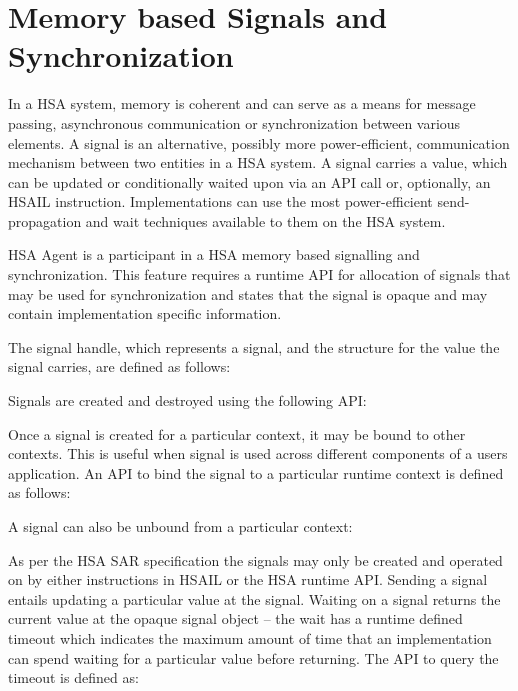 \documentclass{book}
\begin{document}
\hypertarget{signals}{}\section{Memory based Signals and
Synchronization}\label{signals}

In a HSA system, memory is coherent and can serve as a means for
message passing, asynchronous communication or synchronization
between various elements.  A signal is an alternative, possibly more
power-efficient, communication mechanism between two entities in a
HSA system. A signal carries a value, which can be updated or
conditionally waited upon via an API call or, optionally, an HSAIL
instruction. Implementations can use the most power-efficient send-propagation
and wait techniques available to them on the  HSA system.

HSA Agent is a participant in a HSA memory based signalling and
synchronization.  This feature requires a runtime API for allocation
of signals that may be used for synchronization and states that the
signal is opaque and may contain implementation specific information.

The signal handle, which represents a signal, and the structure for
the value the signal carries, are defined as follows:



Signals are created and destroyed using the following API:




Once a signal is created for a particular context, it may be bound
to other contexts. This is useful when signal is used across
different components of a users application. An API to bind the
signal to a particular runtime context is defined as follows:



A signal can also be unbound from a particular context:



\vspace{3mm}As per the HSA SAR specification the signals may only be
created and operated on by either instructions in HSAIL or the HSA
runtime API.  Sending a signal entails updating a particular value at
the signal.  Waiting on a signal returns the current value at the
opaque signal object -- the wait has a runtime defined timeout which
indicates the maximum amount of time that an implementation can spend
waiting for a particular value before returning. The API to query the
timeout is defined as:
\end{document}
